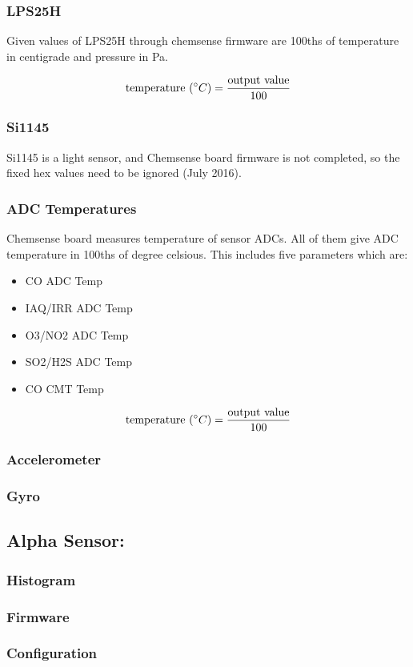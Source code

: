 \subsubsection{ LPS25H}

Given values of LPS25H through chemsense firmware are 100ths of temperature in centigrade and pressure in Pa.

{\centering 
 \[ \text{temperature }(\degree C) = \frac{\text{output value}}{100} \]
}

\subsubsection{ Si1145}

Si1145 is a light sensor, and Chemsense board firmware is not completed, so the fixed hex values need to be ignored (July 2016).

\subsubsection{ ADC Temperatures}
Chemsense board measures temperature of sensor ADCs. All of them give ADC temperature in 100ths of degree celsious. This includes five parameters which are:
 
\begin{itemize}
  \item CO ADC Temp
  \item IAQ/IRR ADC Temp
  \item O3/NO2 ADC Temp
  \item SO2/H2S ADC Temp
  \item CO CMT Temp
\end{itemize}


{\centering 
 \[ \text{temperature }(\degree C) = \frac{\text{output value}}{100} \]
}

\subsubsection{ Accelerometer}

\subsubsection{ Gyro}

\subsection{Alpha Sensor:}
\subsubsection{ Histogram}

\subsubsection{ Firmware}

\subsubsection{ Configuration}